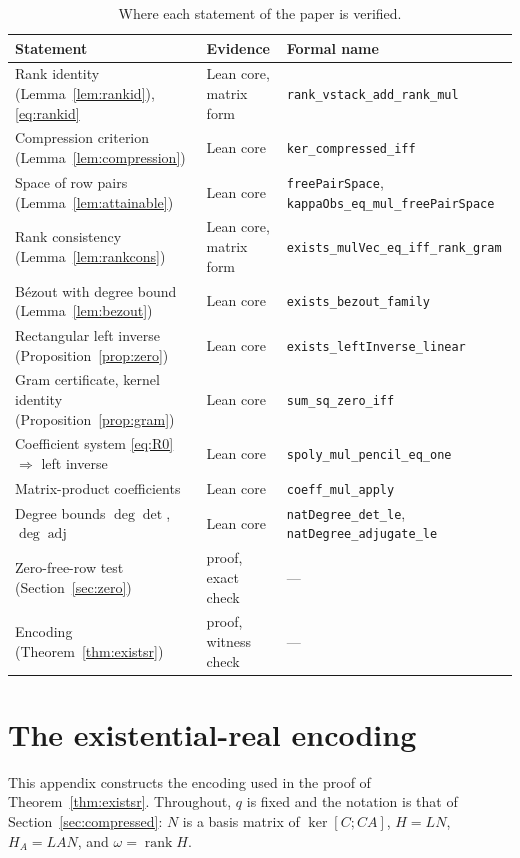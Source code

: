 \documentclass[journal]{IEEEtran}
\theoremstyle{plainn}
\theoremstyle{remark}
\begin{document}
\begin{table}[!t]
\centering
\caption{Where each statement of the paper is verified.}\label{tab:evidence}
\footnotesize
\begin{tabular}{@{}lll@{}}
\toprule
Statement & Evidence & Formal name \\
\midrule
Rank identity (Lemma~\ref{lem:rankid}), \eqref{eq:rankid} & Lean core, matrix form &
\texttt{rank\_vstack\_add\_rank\_mul} \\
Compression criterion (Lemma~\ref{lem:compression}) & Lean core & \texttt{ker\_compressed\_iff} \\
Space of row pairs (Lemma~\ref{lem:attainable}) & Lean core & \texttt{freePairSpace},
\texttt{kappaObs\_eq\_mul\_freePairSpace} \\
Rank consistency (Lemma~\ref{lem:rankcons}) & Lean core, matrix form &
\texttt{exists\_mulVec\_eq\_iff\_rank\_gram} \\
B\'ezout with degree bound (Lemma~\ref{lem:bezout}) & Lean core & \texttt{exists\_bezout\_family} \\
Rectangular left inverse (Proposition~\ref{prop:zero}) & Lean core &
\texttt{exists\_leftInverse\_linear} \\
Gram certificate, kernel identity (Proposition~\ref{prop:gram}) & Lean core &
\texttt{sum\_sq\_zero\_iff} \\
Coefficient system \eqref{eq:R0} $\Rightarrow$ left inverse & Lean core &
\texttt{spoly\_mul\_pencil\_eq\_one} \\
Matrix-product coefficients & Lean core & \texttt{coeff\_mul\_apply} \\
Degree bounds $\deg\det$, $\deg\operatorname{adj}$ & Lean core &
\texttt{natDegree\_det\_le}, \texttt{natDegree\_adjugate\_le} \\
Zero-free-row test (Section~\ref{sec:zero}) & proof, exact check & --- \\
Encoding (Theorem~\ref{thm:existsr}) & proof, witness check & --- \\
\bottomrule
\end{tabular}
\end{table}

\appendices
\section{The existential-real encoding}\label{app:encoding}

This appendix constructs the encoding used in the proof of Theorem~\ref{thm:existsr}. Throughout, $q$ is fixed and the notation is that of Section~\ref{sec:compressed}: $N$ is a basis matrix of $\ker[C;CA]$, $H=LN$, $H_A=LAN$, and $\omega=\operatorname{rank}H$.
\end{document}
